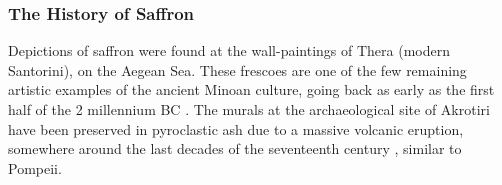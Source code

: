 














\subsubsection{The History of Saffron}

Depictions of saffron were found at the wall-paintings of Thera (modern Santorini), on the Aegean Sea. These frescoes are one of the few remaining artistic examples of the ancient Minoan culture, going back as early as the first half of the 2 millennium BC \autocite[29-31]{doumas_wall-paintings_1992}. The murals at the archaeological site of Akrotiri have been preserved in pyroclastic ash due to a massive volcanic eruption, somewhere around the last decades of the seventeenth century \BC{}, similar to Pompeii.






